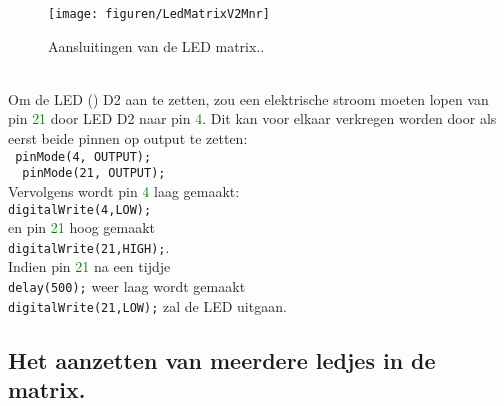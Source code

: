 \begin{minipage}{\linewidth}
	\begin{wrapfigure}[23]{r}{0.6\textwidth}
		\vspace{-15pt}
		\begin{center}
			\centering
			\captionsetup{justification=centering}
			\texttt{[image: figuren/LedMatrixV2Mnr]}
		\end{center}
		\caption{Aansluitingen van de LED matrix..}
		\label{fig:ledmtx2}
	\end{wrapfigure}
	
~\vspace{2mm}\\
	Om de LED  () D2 aan te zetten, zou een elektrische stroom moeten lopen van  pin  \textcolor {Green}{21} door LED D2 naar pin \textcolor{Green}{4}.
	Dit kan voor elkaar verkregen worden door als eerst beide pinnen op output te zetten:\\
	\lstinline|	pinMode(4, OUTPUT);|\\ \lstinline|	pinMode(21, OUTPUT);|\\
	Vervolgens wordt pin \textcolor {Green}{4} laag gemaakt:\\
	 \lstinline|digitalWrite(4,LOW);|\\ en pin \textcolor {Green}{21} hoog gemaakt\\ \lstinline|digitalWrite(21,HIGH);|.\\
	 Indien pin \textcolor {Green}{21}  na een tijdje\\ \lstinline|delay(500);| weer laag wordt gemaakt\\ \lstinline|digitalWrite(21,LOW);| zal de LED uitgaan.
\end{minipage}


\subsection{Het aanzetten van meerdere ledjes in de matrix.}\label{sect:mulLED}

